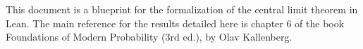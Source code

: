 
This document is a blueprint for the formalization of the central limit theorem in Lean.
The main reference for the results detailed here is chapter 6 of the book Foundations of Modern Probability (3rd ed.), by Olav Kallenberg.




